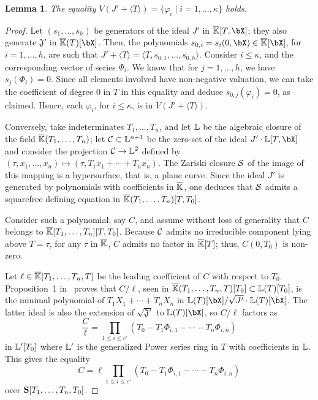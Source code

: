 \documentclass[12pt]{article}
\newtheorem{lemma}[definition]{Lemma}
\begin{document}
\begin{lemma}\label{lemma:Z1}
  The equality $V(J' +\langle T \rangle)=\{\varphi_i \mid i=1,\dots,\kappa\}$ holds.
\end{lemma}
\begin{proof}
  Let $(s_1,\dots,s_h)$ be generators of the ideal $J'$ in
  $\KKbar[T,\bX]$; they also generate $\mathfrak{J}'$ in
  $\KKbar(T)[\bX]$. Then, the polynomials $s_{0,i}=s_i(0,\bX) \in
  \KKbar[\bX]$, for $i=1,\dots,h$, are such that $J'+\langle T\rangle
  = \langle T,s_{0,1},\dots,s_{0,h} \rangle$.  Consider $i \le
  \kappa$, and the corresponding vector of series $\Phi_i$. We know
  that for $j=1,\dots,h$, we have $s_j(\Phi_i)=0$.  Since all elements
  involved have non-negative valuation, we can take the coefficient of
  degree $0$ in $T$ in this equality and deduce
  $s_{0,j}(\varphi_i)=0$, as claimed. Hence, each $\varphi_i$, for $i
  \le \kappa$, is in $V(J' + \langle T \rangle)$.

  Conversely, take indeterminates $T_1,\dots,T_n$, and let $\mathbb{L}$ be
  the algebraic closure of the field $\overline{\mathbb{K}}(T_1,\dots,T_n)$; let
  ${\cal C}\subset{\ensuremath{\mathbb{L}}}{}^{n+1}$ be the zero-set of the ideal $J'\cdot
  \LL[T,\bX]$ and consider the projection ${\cal C} \to {\ensuremath{\mathbb{L}}}{}^2$
  defined by $(\tau,x_1,\dots,x_n)\mapsto (\tau,T_1 x_1 + \cdots + T_n
  x_n)$. The Zariski closure ${\cal S}$ of the image of this mapping
  is a hypersurface, that is, a plane curve.  Since the ideal $J'$ is generated by polynomials
  with coefficients in $\overline{\mathbb{K}}$, one deduces that ${\cal S}$ admits a squarefree
  defining equation in $\overline{\mathbb{K}}(T_1,\dots,T_n)[T,T_0]$.

  Consider such a polynomial, say $C$, and assume without loss of
  generality that $C$ belongs to 
  $\overline{\mathbb{K}}[T_1,\dots,T_n][T,T_0]$. Because ${\cal C}$ admits no irreducible
  component lying above $T=\tau$, for any $\tau$ in $\overline{\mathbb{K}}$, $C$
  admits no factor in $\overline{\mathbb{K}}[T]$; thus, $C(0,T_0)$ is non-zero.

  Let $\ell \in \overline{\mathbb{K}}[T_1,\dots,T_n,T]$ be the leading coefficient of
  $C$ with respect to $T_0$. Proposition~1 in~\cite{Schost03} proves
  that $C/\ell$, seen in $\overline{\mathbb{K}}(T_1,\dots,T_n,T)[T_0] \subset
  \mathbb{L}(T)[T_0]$, is the minimal polynomial of $T_1 X_1 + \cdots +
  T_n X_n$ in $\LL(T)[\bX]/\sqrt{J'}\cdot \LL(T)[\bX]$. The latter ideal
  is also the extension of $\sqrt{\mathfrak{J}'}$ to $\LL(T)[\bX]$, 
  so $C/\ell$ factors as
  $$\frac C\ell = \prod_{1\le i \le c'}(T_0-T_1 \Phi_{i,1} - \cdots - T_n \Phi_{i,n})$$
  in $\mathbb{L}' [T_0]$ where $\mathbb{L}'$ is the generalized Power
  series ring in $T$ with coefficients in $\mathbb{L}$.  This gives the
  equality
  $$C =\ell \prod_{1\le i \le  c'}(T_0-T_1 \Phi_{i,1} - \cdots - T_n
  \Phi_{i,n})$$ over $\mathbf{S}[T_1,\dots,T_n,T_0]$. 


\end{proof}
\end{document}
